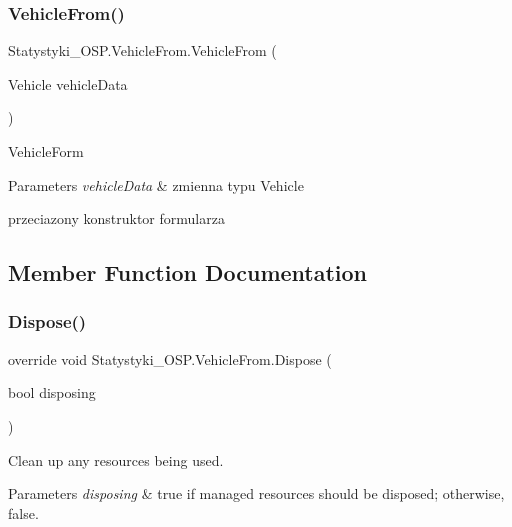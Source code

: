 \subsubsection{\texorpdfstring{VehicleFrom()}{VehicleFrom()}\hspace{0.1cm}{\footnotesize\ttfamily [2/2]}}
{\footnotesize\ttfamily Statystyki\+\_\+\+O\+S\+P.\+Vehicle\+From.\+Vehicle\+From (\begin{DoxyParamCaption}\item[{Vehicle}]{vehicle\+Data }\end{DoxyParamCaption})}



Vehicle\+Form 


\begin{DoxyParams}{Parameters}
{\em vehicle\+Data} & zmienna typu Vehicle\\
\hline
\end{DoxyParams}


przeciazony konstruktor formularza

\subsection{Member Function Documentation}
\mbox{\label{class_statystyki___o_s_p_1_1_vehicle_from_ac2cb5de1e458cfaac3f8a1644bc1437c}} 
\subsubsection{\texorpdfstring{Dispose()}{Dispose()}}
{\footnotesize\ttfamily override void Statystyki\+\_\+\+O\+S\+P.\+Vehicle\+From.\+Dispose (\begin{DoxyParamCaption}\item[{bool}]{disposing }\end{DoxyParamCaption})\hspace{0.3cm}{\ttfamily [protected]}}



Clean up any resources being used. 


\begin{DoxyParams}{Parameters}
{\em disposing} & true if managed resources should be disposed; otherwise, false.\\
\hline
\end{DoxyParams}
\mbox{\label{class_statystyki___o_s_p_1_1_vehicle_from_a2a4c3e922575fbf0e9010c2445d6f114}} 

